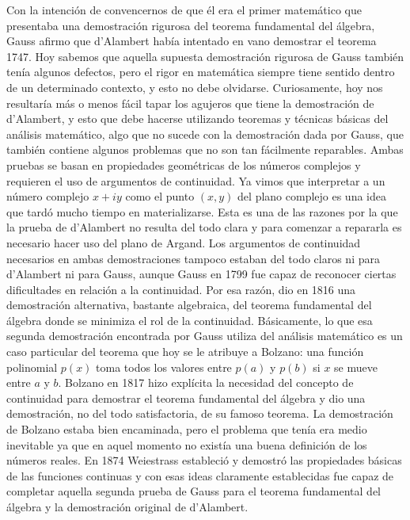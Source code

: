 Con la intención de convencernos de que él era el primer matemático que
presentaba una demostración rigurosa del teorema fundamental del álgebra, Gauss
afirmo que d'Alambert había intentado en vano demostrar el teorema 1747. Hoy
sabemos que aquella supuesta demostración rigurosa de Gauss también tenía
algunos defectos, pero el rigor en matemática siempre tiene sentido dentro de
un determinado contexto, y esto no debe olvidarse. Curiosamente, hoy nos
resultaría más o menos fácil tapar los agujeros que tiene la demostración de
d'Alambert, y esto que debe hacerse utilizando teoremas y técnicas básicas del
análisis matemático, algo que no sucede con la demostración dada por Gauss, que
también contiene algunos problemas que no son tan fácilmente reparables.  Ambas
pruebas se basan en propiedades geométricas de los números complejos y
requieren el uso de argumentos de continuidad. Ya vimos que interpretar a un
número complejo $x+iy$ como el punto $(x,y)$ del plano complejo es una idea que
tardó mucho tiempo en materializarse. Esta es una de las razones por la que la
prueba de d'Alambert no resulta del todo clara y para comenzar a repararla es
necesario hacer uso del plano de Argand. Los argumentos de continuidad
necesarios en ambas demostraciones tampoco estaban del todo claros ni para
d'Alambert ni para Gauss, aunque Gauss en 1799 fue capaz de reconocer ciertas
dificultades en relación a la continuidad. Por esa razón, dio en 1816 una
demostración alternativa, bastante algebraica, del teorema fundamental del
álgebra donde se minimiza el rol de la continuidad. Básicamente, lo que esa
segunda demostración encontrada por Gauss utiliza del análisis matemático es un
caso particular del teorema que hoy se le atribuye a Bolzano: una función
polinomial $p(x)$ toma todos los valores entre $p(a)$ y $p(b)$ si $x$ se mueve
entre $a$ y $b$. Bolzano en 1817 hizo explícita la necesidad del concepto de
continuidad para demostrar el teorema fundamental del álgebra y dio una
demostración, no del todo satisfactoria, de su famoso teorema. La demostración
de Bolzano estaba bien encaminada, pero el problema que tenía era medio
inevitable ya que en aquel momento no existía una buena definición de los
números reales. En 1874 Weiestrass estableció y demostró las propiedades
básicas de las funciones continuas y con esas ideas claramente establecidas fue
capaz de completar aquella segunda prueba de Gauss para el teorema fundamental
del álgebra y la demostración original de d'Alambert.


